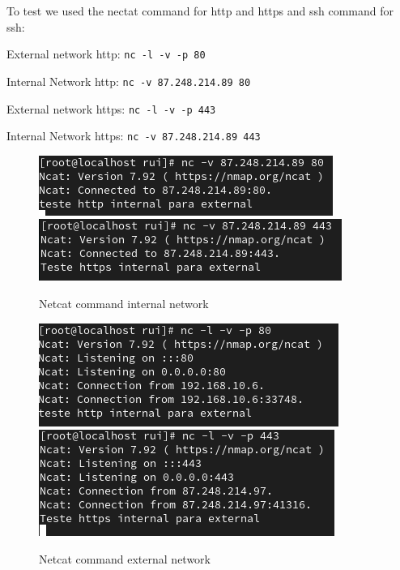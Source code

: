 \documentclass{article}
\begin{document}
To test we used the nectat command for http and https and ssh command for ssh:
\texttt{}\par
\texttt{}\par
External network http: \texttt{nc -l -v -p 80} \par
Internal Network http: \texttt{nc -v 87.248.214.89 80} \par
\texttt{}\par
\texttt{}\par
External network https: \texttt{nc -l -v -p 443} \par
Internal Network https: \texttt{nc -v 87.248.214.89 443} \par
\texttt{}\par
\begin{figure}[H]
    \centering
    \includegraphics[scale=0.5]{out/out_http_snat_internal.png}
    \includegraphics[scale=0.5]{out/out_https_snat_internal.png}
    \caption{Netcat command internal network}
    \label{fig:network-arc}
\end{figure}

\begin{figure}[H]
    \centering
    \includegraphics[scale=0.5]{out/out_http_snat_external.png}
    \includegraphics[scale=0.5]{out/out_https_snat_external.png}
    \caption{Netcat command external network}
    \label{fig:network-arc}
\end{figure}
\texttt{}\par
\end{document}
